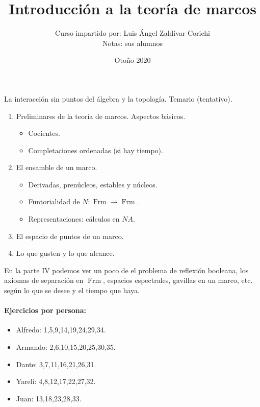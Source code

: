 \documentclass[12pt,letterpaper,titlepage]{article}
\title{Introducción a la teoría de marcos}
\author{Curso impartido por: Luis Ángel Zaldívar Corichi \\
\small{Notas: sus alumnos}}
\date{Otoño 2020}
\theoremstyle{definition}
\newcommand\<{\langle}
\renewcommand\>{\rangle}
\DeclareMathOperator{\Frm}{Frm}
\begin{document}
\maketitle

La interacción sin puntos del álgebra y la topología.
Temario (tentativo).
\begin{enumerate}[label=\Roman*.]
  \item Preliminares de la teoría de marcos. Aspectos básicos.
  \begin{itemize}
      \item Cocientes.
      \item Completaciones ordenadas (si hay tiempo).
  \end{itemize}
  \item El ensamble de un marco.
  \begin{itemize}
      \item Derivadas, prenúcleos, estables y núcleos.
      \item Funtorialidad de $N:\Frm\to\Frm$.
      \item Representaciones: cálculos en $NA$.
  \end{itemize}
  \item El espacio de puntos de un marco.
  \item Lo que gusten y lo que alcance.
\end{enumerate}

En la parte IV podemos ver un poco de el problema de reflexión
booleana, los axiomas de
separación en $\Frm$, espacios espectrales, gavillas en un marco,
etc. según lo que se desee y el tiempo que haya.

\newpage
\tableofcontents

\paragraph{Ejercicios por persona:}
\begin{multicols}{2}
\begin{itemize}
    \item Alfredo: 1,5,9,14,19,24,29,34.
    \item Armando: 2,6,10,15,20,25,30,35.
    \item Dante: 3,7,11,16,21,26,31.
    \item Yareli: 4,8,12,17,22,27,32.
    \item Juan: 13,18,23,28,33.
\end{itemize}
\end{multicols}
\end{document}

